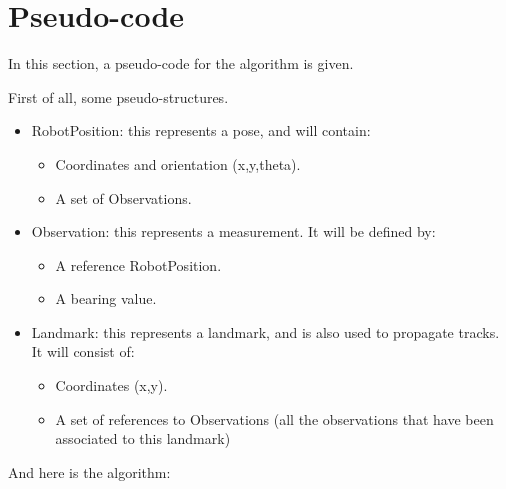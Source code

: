 \section{Pseudo-code}\label{sec:pseudocode}
In this section, a pseudo-code for the algorithm is given.

First of all, some pseudo-structures.
\begin{itemize}
  \item RobotPosition: this represents a pose, and will contain:
    \begin{itemize}
      \item Coordinates and orientation (x,y,theta).
      \item A set of Observations.
    \end{itemize}
  \item Observation: this represents a measurement. It will be defined by:
    \begin{itemize}
      \item A reference RobotPosition.
      \item A bearing value.
    \end{itemize}
  \item Landmark: this represents a landmark, and is also used to propagate tracks. It will consist of:
    \begin{itemize}
      \item Coordinates (x,y).
      \item A set of references to Observations (all the observations that have been associated to this landmark)
    \end{itemize}
\end{itemize}

And here is the algorithm:

